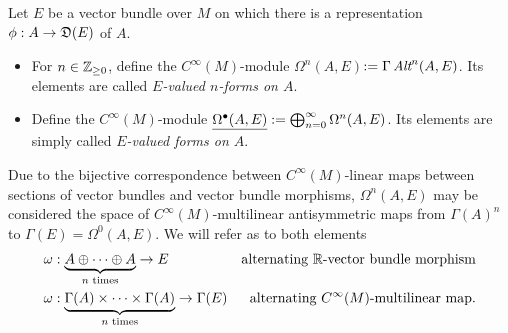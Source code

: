 \begin{definition}
Let $E$ be a vector bundle over $M$ on which there is a representation $\phi: A \to \alg D(E)$ of $A$.

    \begin{itemize}
    
    \item For $n \in \mathbb{Z}_{\geq 0}$, define the $C^\infty(M)$-module \emph{$\Omega^n(A, E)$}$:= \Gamma\operatorname{\textit{Alt}}^n(A, E)$. Its elements are called \emph{$E$-valued $n$-forms on $A$}.
    
    \item Define the $C^\infty(M)$-module $\emph{\Omega^\bullet(A, E)} := \bigoplus^\infty_{n = 0} \Omega^n(A, E)$. Its elements are simply called \emph{$E$-valued forms on $A$}.
    
    
        
    \end{itemize}
    
\end{definition}

\begin{remark}
Due to the bijective correspondence between $C^\infty(M)$-linear maps between sections of vector bundles and vector bundle morphisms, $\Omega^n(A, E)$ may be considered the space of $C^\infty(M)$-multilinear antisymmetric maps from $\Gamma(A)^n$ to $\Gamma(E) = \Omega^0(A, E)$. We will refer as  to both elements
\begin{align}
    \omega &: \underbrace{A \oplus \cdots \oplus A}_{\text{$n$ times}} \to E & \text{alternating $\mathbb{R}$-vector bundle morphism}\\
    \omega &: \underbrace{\Gamma(A) \times \cdots \times \Gamma(A)}_{\text{$n$ times}} \to \Gamma(E) & \text{alternating $C^\infty(M)$-multilinear map}.
\end{align}
    
    
\end{remark}

